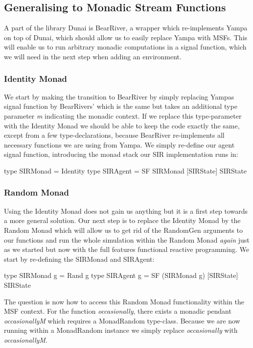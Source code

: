 \subsection{Generalising to Monadic Stream Functions}
\label{sec:generalising_msfs}
A part of the library Dunai is BearRiver, a wrapper which re-implements Yampa on top of Dunai, which should allow us to easily replace Yampa with MSFs. This will enable us to run arbitrary monadic computations in a signal function, which we will need in the next step when adding an environment.

\subsubsection{Identity Monad}
We start by making the transition to BearRiver by simply replacing Yampas signal function by BearRivers' which is the same but takes an additional type parameter \textit{m} indicating the monadic context. If we replace this type-parameter with the Identity Monad we should be able to keep the code exactly the same, except from a few type-declarations, because BearRiver re-implements all necessary functions we are using from Yampa. We simply re-define our agent signal function, introducing the monad stack our SIR implementation runs in:

\begin{HaskellCode}
type SIRMonad    = Identity
type SIRAgent    = SF SIRMonad [SIRState] SIRState
\end{HaskellCode}

\subsubsection{Random Monad}
Using the Identity Monad does not gain us anything but it is a first step towards a more general solution. Our next step is to replace the Identity Monad by the Random Monad which will allow us to get rid of the RandomGen arguments to our functions and run the whole simulation within the Random Monad \textit{again} just as we started but now with the full features functional reactive programming.
We start by re-defining the SIRMonad and SIRAgent:

\begin{HaskellCode}
type SIRMonad g = Rand g
type SIRAgent g = SF (SIRMonad g) [SIRState] SIRState
\end{HaskellCode}

The question is now how to access this Random Monad functionality within the MSF context. For the function \textit{occasionally}, there exists a monadic pendant \textit{occasionallyM} which requires a MonadRandom type-class. Because we are now running within a MonadRandom instance we simply replace \textit{occasionally} with \textit{occasionallyM}. 

